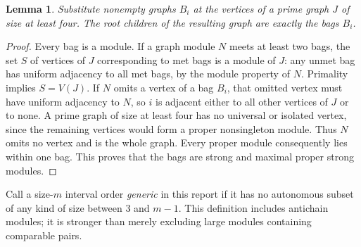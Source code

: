 \documentclass[11pt,letterpaper]{article}
\newtheorem{lemma}[theorem]{Lemma}
\theoremstyle{definition}\newtheorem{definition}[theorem]{Definition}
\theoremstyle{remark}\newtheorem{remark}[theorem]{Remark}
\begin{document}
\begin{lemma}\label{ivg:lem:bags}
Substitute nonempty graphs $B_i$ at the vertices of a prime graph $J$ of size at least four. The root children of the resulting graph are exactly the bags $B_i$.
\end{lemma}
\begin{proof}
Every bag is a module. If a graph module $N$ meets at least two bags, the set $S$ of vertices of $J$ corresponding to met bags is a module of $J$: any unmet bag has uniform adjacency to all met bags, by the module property of $N$. Primality implies $S=V(J)$. If $N$ omits a vertex of a bag $B_i$, that omitted vertex must have uniform adjacency to $N$, so $i$ is adjacent either to all other vertices of $J$ or to none. A prime graph of size at least four has no universal or isolated vertex, since the remaining vertices would form a proper nonsingleton module. Thus $N$ omits no vertex and is the whole graph. Every proper module consequently lies within one bag. This proves that the bags are strong and maximal proper strong modules.
\end{proof}

Call a size-$m$ interval order \emph{generic} in this report if it has no autonomous subset of any kind of size between 3 and $m-1$. This definition includes antichain modules; it is stronger than merely excluding large modules containing comparable pairs.
\end{document}
